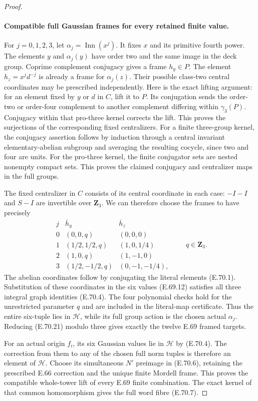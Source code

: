 \begin{proof}
\paragraph{Compatible full Gaussian frames for every retained finite value.}
For $j=0,1,2,3$, let $\alpha_j=\operatorname{Inn}(x^j)$.
It fixes $x$ and its primitive fourth power.
The elements $y$ and $\alpha_j(y)$ have order two
and the same image in the deck group. Coprime
complement conjugacy gives a frame $h_y\in P$.
The element $h_z=x^jd^{-j}$ is already a frame for
$\alpha_j(z)$. Their possible class-two central
coordinates may be prescribed independently.
Here is the exact lifting argument: for an element
fixed by $y$ or $d$ in $C$, lift it to $P$. Its
conjugation sends the order-two or order-four
complement to another complement differing within
$\gamma_3(P)$. Conjugacy within that pro-three
kernel corrects the lift. This proves the
surjections of the corresponding fixed centralizers.
For a finite three-group kernel, the conjugacy
assertion follows by induction through a central
invariant elementary-abelian subgroup and averaging
the resulting cocycle, since two and four are units.
For the pro-three kernel, the finite conjugator sets
are nested nonempty compact sets. This proves the
claimed conjugacy and centralizer maps in the full
groups.

The fixed centralizer in $C$ consists of its central
coordinate in each case: $-I-I$ and $S-I$ are
invertible over $\mathbf Z_3$. We can therefore
choose the frames to have precisely
\[
 \begin{array}{c|c|c}
 j&\overline h_y&\overline h_z\\ \hline
 0&(0,0,q)&(0,0,0)\\
 1&(1/2,1/2,q)&(1,0,1/4)\\
 2&(1,0,q)&(1,-1,0)\\
 3&(1/2,-1/2,q)&(0,-1,-1/4),
 \end{array}
 \qquad q\in\mathbf Z_3.
 \tag{E.70.21}
\]
The abelian coordinates follow by conjugating the
literal elements (E.70.1). Substitution of these
coordinates in the six values (E.69.12) satisfies
all three integral graph identities (E.70.4).
The four polynomial checks hold for the unrestricted
parameter $q$ and are included in the literal-map
certificate. Thus the entire six-tuple lies in
$\mathscr H$, while its full group action is the
chosen actual $\alpha_j$. Reducing (E.70.21) modulo
three gives exactly the twelve E.69 framed targets.

For an actual origin $f_i$, its six Gaussian values
lie in $\mathscr H$ by (E.70.4). The correction from
them to any of the chosen full norm tuples is
therefore an element of $\mathscr H$. Choose its
simultaneous $N'$ preimage in (E.70.6), retaining
the prescribed E.66 correction and the unique
finite Mordell frame. This proves the compatible
whole-tower lift of every E.69 finite combination.
The exact kernel of that common homomorphism gives
the full word fibre (E.70.7).
\end{proof}

